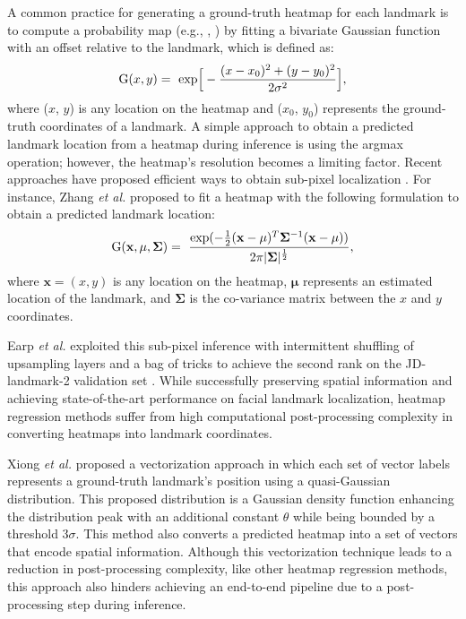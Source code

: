 \documentclass[journal]{IEEEtran}
\begin{document}
A common practice for generating a ground-truth heatmap for each landmark is to compute a probability map (e.g., \cite{Newell2016}, \cite{Wei2016}) by fitting a bivariate Gaussian function with an offset relative to the landmark, which is defined as:
\begin{equation}
    \label{eq:generic_heatmap}
    \text G(x, y) =
        \ \mbox{exp}\Big[-{\frac{(x - x_{0})^2 + (y - y_{0})^2}{2{\sigma}^2}}\Big] ,
\end{equation}
where ($x$, $y$) is any location on the heatmap and ($x_{0}$, $y_{0}$) represents the ground-truth coordinates of a landmark. 
A simple approach to obtain a predicted landmark location from a heatmap during inference is using the argmax operation; however, the heatmap's resolution becomes a limiting factor. 
Recent approaches have proposed efficient ways to obtain sub-pixel localization \cite{Xiao2018SimpleBF, zhang2019distributionaware}.
For instance, Zhang \textit{et al.} \cite{zhang2019distributionaware} proposed to fit a heatmap with the following formulation to obtain a predicted landmark location:
\begin{equation}
    \label{eq:guassian_fitting}
    \text G(\mathbf{x}, \mathbf{\mu}, \mathbf{\Sigma}) =
        \ \frac{\text{exp}(- \frac{1}{2}(\mathbf{x} - \mathbf{\mu})^{T}\mathbf{\Sigma}^{-1} (\mathbf{x} - \mathbf{\mu}))}{2 \pi |\mathbf{\Sigma}|^{\frac{1}{2}}} ,
\end{equation}
where $\mathbf{x}=(x, y)$ is any location on the heatmap, $\mathbf{\mu}$ represents an estimated location of the landmark, and $\mathbf{\Sigma}$ is the co-variance matrix between the $x$ and $y$ coordinates.

Earp \textit{et al.} \cite{earp2021sub} exploited this sub-pixel inference with intermittent shuffling of upsampling layers and a bag of tricks to achieve the second rank on the JD-landmark-2 validation set \cite{liu2019}.
While successfully preserving spatial information and achieving state-of-the-art performance on facial landmark localization, heatmap regression methods suffer from high computational post-processing complexity in converting heatmaps into landmark coordinates.

Xiong \textit{et al.} \cite{xiong2020} proposed a vectorization approach in which each set of vector labels represents a ground-truth landmark's position using a quasi-Gaussian distribution.
This proposed distribution is a Gaussian density function enhancing the distribution peak with an additional constant $\theta$ while being bounded by a threshold $3\sigma$. 
This method also converts a predicted heatmap into a set of vectors that encode spatial information.
Although this vectorization technique leads to a reduction in post-processing complexity, like other heatmap regression methods, this approach also hinders achieving an end-to-end pipeline due to a post-processing step during inference.
\end{document}
